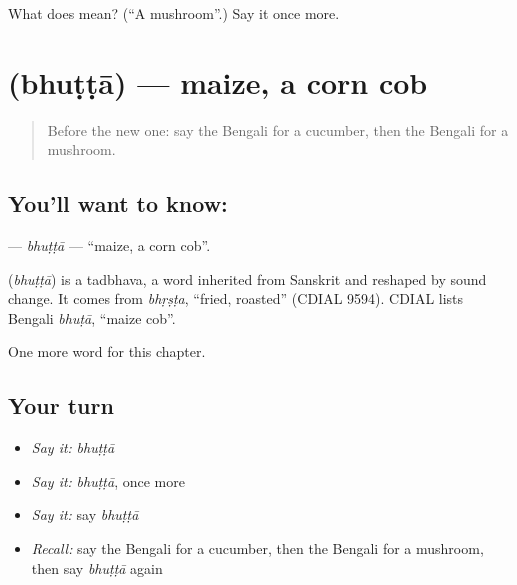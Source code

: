 \begin{tcolorbox}[breakable,colback=teal!4,colframe=teal!35!black,title={Before you move on}]
What does  mean? (\textquotedblleft{}A mushroom\textquotedblright{}.) Say it once more.
\end{tcolorbox}
\section[\texorpdfstring{\bn{ভুট্টা} (bhuṭṭā)}{ভুট্টা (bhuṭṭā)}]{ (bhuṭṭā) — maize, a corn cob}

\label{lesson:BN-C232-bhutta}



\begin{quote}
Before the new one: say the Bengali for a cucumber, then the Bengali for a mushroom.
\end{quote}

\subsection*{You'll want to know: }
\textbf{} — \emph{bhuṭṭā} — \textquotedblleft{}maize, a corn cob\textquotedblright{}.

\begin{cousinweb}
\textbf{} (\emph{bhuṭṭā}) is a tadbhava, a word inherited from Sanskrit and reshaped by sound change. It comes from \emph{bhṛṣṭa}, \textquotedblleft{}fried, roasted\textquotedblright{} (CDIAL 9594). CDIAL lists Bengali \emph{bhuṭā}, \textquotedblleft{}maize cob\textquotedblright{}.
\end{cousinweb}

\begin{grammarlens}[title={What you've built}]
One more word for this chapter.
\end{grammarlens}

\subsection*{Your turn}
\begin{itemize}
\raggedright
  \item \emph{Say it:} \emph{bhuṭṭā}
  \item \emph{Say it:} \emph{bhuṭṭā}, once more
  \item \emph{Say it:} say \emph{bhuṭṭā}
  \item \emph{Recall:} say the Bengali for a cucumber, then the Bengali for a mushroom, then say \emph{bhuṭṭā} again
\end{itemize}

